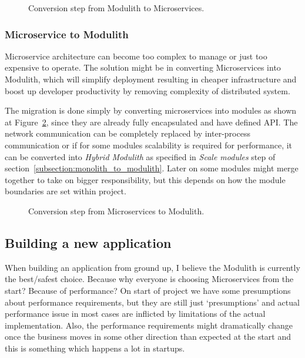 \begin{figure}
    \centering
    
    \caption{Conversion step from Modulith to Microservices.\label{fig:modulith_to_microservices_steps}}
\end{figure}


\subsubsection{Microservice to Modulith}
Microservice architecture can become too complex to manage or just too expensive to operate. The solution might be in converting Microservices into Modulith, which will simplify deployment resulting in cheaper infrastructure and boost up developer productivity by removing complexity of distributed system.

The migration is done simply by converting microservices into modules as shown at Figure~\ref{fig:microservices_to_modulith_steps}, since they are already fully encapsulated and have defined API. The network communication can be completely replaced by inter-process communication or if for some modules scalability is required for performance, it can be converted into \textit{Hybrid Modulith} as specified in \textit{Scale modules} step of section~\ref{subsection:monolith_to_modulith}. Later on some modules might merge together to take on bigger responsibility, but this depends on how the module boundaries are set within project.

\begin{figure}
    \centering
    
    \caption{Conversion step from Microservices to Modulith.\label{fig:microservices_to_modulith_steps}}
\end{figure}


\subsection{Building a new application}
When building an application from ground up, I believe the Modulith is currently the best/safest choice. Because why everyone is choosing Microservices from the start? Because of performance? On start of project we have some presumptions about performance requirements, but they are still just `presumptions' and actual performance issue in most cases are inflicted by limitations of the actual implementation. Also, the performance requirements might dramatically change once the business moves in some other direction than expected at the start and this is something which happens a lot in startups.


